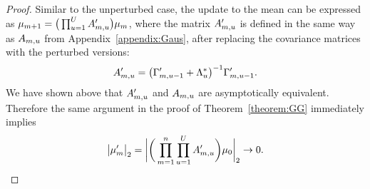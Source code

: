 \begin{proof}
Similar to the unperturbed case, the update to the mean can be expressed as $\mu_{m+1} = \big(\prod_{u = 1}^UA'_{m, u}\big)\mu_m$, where the matrix $A'_{m, u}$ is defined in the same way as $A_{m, u}$ from Appendix~\ref{appendix:Gaus}, after replacing the covariance matrices with the perturbed versions: 
$$
A'_{m, u} = \big(\Gamma'_{m, u - 1} + \Lambda^*_u\big)^{-1}\Gamma'_{m, u - 1}.
$$
We have shown above that $A'_{m, u}$ and $A_{m, u}$ are asymptotically equivalent. 
Therefore the same argument in the proof of Theorem~\ref{theorem:GG} immediately implies
$$
\big| \mu'_{m} \big|_2 =
  \bigg|
    \bigg(
      \prod_{m = 1}^n\prod_{u = 1}^U A'_{m, u}
    \bigg)
    \mu_0
  \bigg|_2 \rightarrow 0.
$$

   \end{proof}
